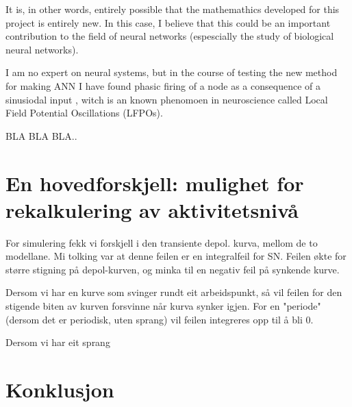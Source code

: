 	It is, in other words, entirely possible that the mathemathics developed for this project is entirely new. 
	In 	this case, I believe that this could be an important contribution to the field of neural networks (espescially the study of biological neural networks).

	I am no expert on neural systems, but in the course of testing the new method for making ANN I have found phasic firing of a node as a consequence of a sinusiodal input %
	, witch is an known phenomoen in neuroscience called Local Field Potential Oscillations (LFPOs).
	
	BLA BLA BLA..

	\section{En hovedforskjell: mulighet for rekalkulering av aktivitetsnivå}
	For simulering fekk vi forskjell i den transiente depol. kurva, mellom de to modellane.
	Mi tolking var at denne feilen er en integralfeil for SN. Feilen økte for større stigning på depol-kurven, og minka til en negativ feil på synkende kurve.
	
	Dersom vi har en kurve som svinger rundt eit arbeidspunkt, så vil feilen for den stigende biten av kurven forsvinne når kurva synker igjen. For en "periode" (dersom det er periodisk, uten sprang) vil feilen integreres opp til å bli 0.

	Dersom vi har eit sprang 


	\section{ Konklusjon }
